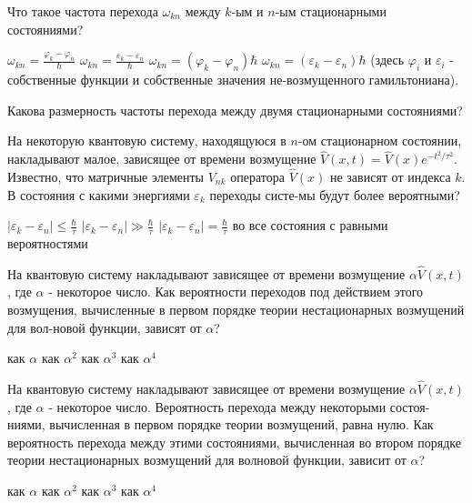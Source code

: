 \documentclass[11pt,a4paper]{exam}
\begin{document}
\begin{questions}
\question Что такое частота перехода ${\omega _{kn}}$ между $k$-ым и $n$-ым стационарными состояниями?
\begin{choices}
\choice ${\omega _{kn}} = \frac{{{\varphi _k} - {\varphi _n}}}{\hbar }$   
\choice ${\omega _{kn}} = \frac{{{\varepsilon _k} - {\varepsilon _n}}}{\hbar }$ 
\choice ${\omega _{kn}} = \left( {{\varphi _k} - {\varphi _n}} \right)\hbar $      
\choice ${\omega _{kn}} = \left( {{\varepsilon _k} - {\varepsilon _n}} \right)\hbar $
(здесь ${\varphi _i}$ и ${\varepsilon _i}$ - собственные функции и собственные значения не-возмущенного гамильтониана).
\end{choices}

\question Какова размерность частоты перехода между двумя стационарными состояниями?
\begin{choices}
\choice    
\choice    
\choice    
\choice 
\end{choices}

\question На некоторую квантовую систему, находящуюся в $n$-ом стационарном состоянии, накладывают малое, зависящее от времени возмущение $\hat V(x,t) = \hat V(x){e^{ - {t^2}/{\tau ^2}}}$. Известно, что матричные элементы ${V_{nk}}$ оператора $\hat V(x)$ не зависят от индекса $k$. В состояния с какими энергиями ${\varepsilon _k}$ переходы систе-мы будут более вероятными?
\begin{choices}
\choice $\left| {{\varepsilon _k} - {\varepsilon _n}} \right| \le \frac{\hbar }{\tau }$     
\choice $\left| {{\varepsilon _k} - {\varepsilon _n}} \right| \gg \frac{\hbar }{\tau }$
\choice $\left| {{\varepsilon _k} - {\varepsilon _n}} \right| = \frac{\hbar }{\tau }$    
\choice во все состояния с равными вероятностями
\end{choices}

\question На квантовую систему накладывают зависящее от времени возмущение $\alpha \hat V(x,t)$, где $\alpha $ - некоторое число. Как вероятности переходов под действием этого возмущения, вычисленные в первом порядке теории нестационарных возмущений для вол-новой функции, зависят от $\alpha $?
\begin{choices}
\choice как $\alpha $  
\choice как ${\alpha ^2}$ 
\choice как ${\alpha ^3}$ 
\choice как ${\alpha ^4}$
\end{choices}

\question На квантовую систему накладывают зависящее от времени возмущение $\alpha \hat V(x,t)$, где $\alpha $ - некоторое число. Вероятность перехода между некоторыми состоя-ниями, вычисленная в первом порядке теории возмущений, равна нулю. Как вероятность перехода между этими состояниями, вычисленная во втором порядке теории нестационарных возмущений для волновой функции, зависит от $\alpha $?
\begin{choices}
\choice как $\alpha $  
\choice как ${\alpha ^2}$ 
\choice как ${\alpha ^3}$ 
\choice как ${\alpha ^4}$
\end{choices}


\end{questions}
\end{document}
